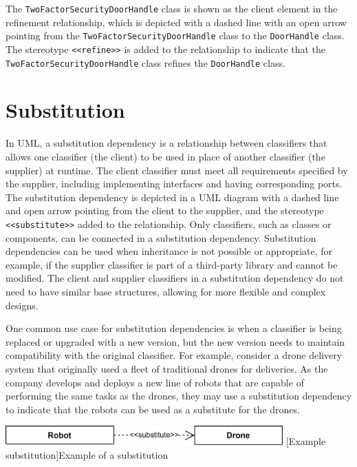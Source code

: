 \documentclass[
	12pt,
    a4paper,
    egregdoesnotlikesansseriftitles, %
    toc=chapterentrywithdots,
    oneside, openany,
    titlepage,
    parskip=half,
    headings=normal,  %
    listof=totoc,
    bibliography=totocnumbered,
    index=totoc,
    captions=tableheading,  %
    listof=flat,
    numbers=noenddot, %
    final]
    {scrbook}
\begin{document}
The \texttt{TwoFactorSecurityDoorHandle} class is shown as the client element in the refinement relationship, which is depicted with a dashed line with an open arrow pointing from the \texttt{TwoFactorSecurityDoorHandle} class to the \texttt{DoorHandle} class. The stereotype \texttt{<<refine>>} is added to the relationship to indicate that the \texttt{TwoFactorSecurityDoorHandle} class refines the \texttt{DoorHandle} class.


\section{Substitution}
In UML, a substitution dependency is a relationship between classifiers that allows one classifier (the client) to be used in place of another classifier (the supplier) at runtime.
The client classifier must meet all requirements specified by the supplier, including implementing interfaces and having corresponding ports. 
The substitution dependency is depicted in a UML diagram with a dashed line and open arrow pointing from the client to the supplier, and the stereotype \texttt{<<substitute>>} added to the relationship. 
Only classifiers, such as classes or components, can be connected in a substitution dependency. 
Substitution dependencies can be used when inheritance is not possible or appropriate, for example, if the supplier classifier is part of a third-party library and cannot be modified. 
The client and supplier classifiers in a substitution dependency do not need to have similar base structures, allowing for more flexible and complex designs. \cite[p. 165]{uml}


One common use case for substitution dependencies is when a classifier is being replaced or upgraded with a new version, but the new version needs to maintain compatibility with the original classifier. For example, consider a drone delivery system that originally used a fleet of traditional drones for deliveries. As the company develops and deploys a new line of robots that are capable of performing the same tasks as the drones, they may use a substitution dependency to indicate that the robots can be used as a substitute for the drones.


\vspace{1em}
\begin{minipage}{\linewidth}
	\centering
	\includegraphics[width=0.8\textwidth]{figures/dependencies/substitute.jpg}
	[Example substitution]{Example of a substitution}
	\label{fig:substitution_example}
\end{minipage}
\vspace{1em}
\end{document}
